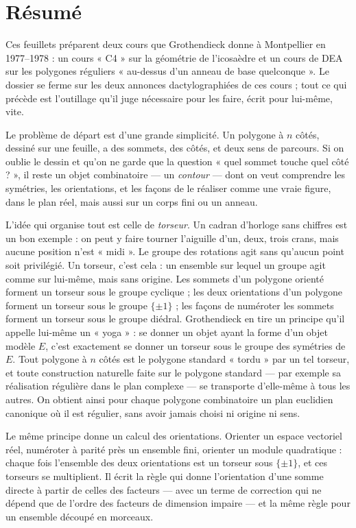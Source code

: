 \documentclass[11pt,a4paper]{article}
\begin{document}
\section*{Résumé}

\begin{resume}
Ces feuillets préparent deux cours que Grothendieck donne à Montpellier en
1977--1978 : un cours « C4 » sur la géométrie de l'icosaèdre et un cours
de DEA sur les polygones réguliers « au-dessus d'un anneau de base
quelconque ». Le dossier se ferme sur les deux annonces dactylographiées de ces
cours ; tout ce qui précède est l'outillage qu'il juge nécessaire pour les
faire, écrit pour lui-même, vite.

Le problème de départ est d'une grande simplicité. Un polygone à $n$ côtés,
dessiné sur une feuille, a des sommets, des côtés, et deux sens de parcours. Si
on oublie le dessin et qu'on ne garde que la question « quel sommet touche quel
côté ? », il reste un objet combinatoire --- un \emph{contour} --- dont on veut
comprendre les symétries, les orientations, et les façons de le réaliser comme
une vraie figure, dans le plan réel, mais aussi sur un corps fini ou un anneau.

L'idée qui organise tout est celle de \emph{torseur}. Un cadran d'horloge sans
chiffres est un bon exemple : on peut y faire tourner l'aiguille d'un, deux,
trois crans, mais aucune position n'est « midi ». Le groupe des rotations agit
sans qu'aucun point soit privilégié. Un torseur, c'est cela : un ensemble sur
lequel un groupe agit comme sur lui-même, mais sans origine. Les sommets d'un
polygone orienté forment un torseur sous le groupe cyclique ; les deux
orientations d'un polygone forment un torseur sous le groupe $\{\pm 1\}$ ; les
façons de numéroter les sommets forment un torseur sous le groupe diédral.
Grothendieck en tire un principe qu'il appelle lui-même un « yoga » : se donner
un objet ayant la forme d'un objet modèle $E$, c'est exactement se donner un
torseur sous le groupe des symétries de $E$. Tout polygone à $n$ côtés est le
polygone standard « tordu » par un tel torseur, et toute construction naturelle
faite sur le polygone standard --- par exemple sa réalisation régulière dans le
plan complexe --- se transporte d'elle-même à tous les autres. On obtient ainsi
pour chaque polygone combinatoire un plan euclidien canonique où il est
régulier, sans avoir jamais choisi ni origine ni sens.

Le même principe donne un calcul des orientations. Orienter un espace
vectoriel réel, numéroter à parité près un ensemble fini, orienter un module
quadratique : chaque fois l'ensemble des deux orientations est un torseur sous
$\{\pm 1\}$, et ces torseurs se multiplient. Il écrit la règle qui donne
l'orientation d'une somme directe à partir de celles des facteurs --- avec un
terme de correction qui ne dépend que de l'ordre des facteurs de dimension
impaire --- et la même règle pour un ensemble découpé en morceaux.


\end{resume}
\end{document}
